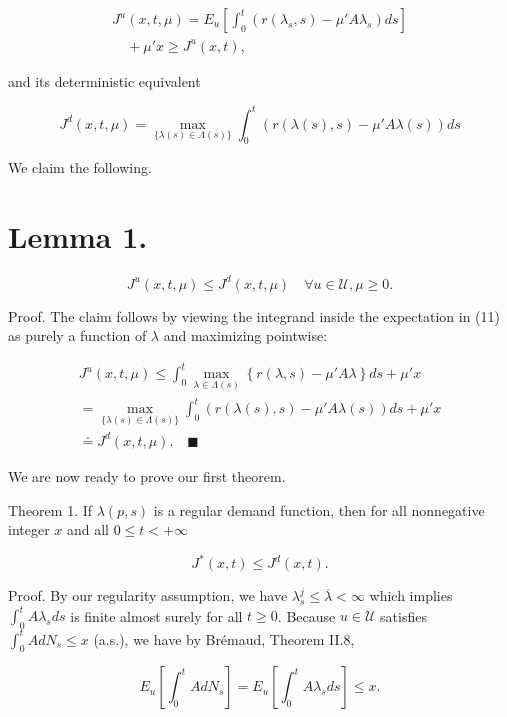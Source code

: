 \[
\begin{array}{l}
J^u(x, t, \mu) = E_u \left[ \int_{0}^{t} \left( r(\lambda_s, s) - \mu' A \lambda_s \right) ds \right] \\
\quad +  \mu' x \geqslant J^u(x, t),
\end{array}
\]

and its deterministic equivalent

\[
J^d(x, t, \mu) = \operatorname*{max}_{\{\lambda(s) \in \Lambda(s)\}} \int_{0}^{t} \left( r(\lambda(s), s) - \mu' A \lambda(s) \right) ds
\]

We claim the following.

\section{Lemma 1.}\label{lemma-1.}

\[
J^u(x, t, \mu) \leqslant J^d(x, t, \mu) \quad \forall u \in \mathcal{U}, \mu \geqslant 0.
\]

Proof. The claim follows by viewing the integrand inside the expectation in (11) as purely a function of \(\lambda\) and maximizing pointwise:

\[
\begin{array}{l}
\displaystyle J^u(x, t, \mu) \leqslant \int_{0}^{t} \max_{\lambda \in \Lambda(s)} \left\{ r(\lambda, s) - \mu' A \lambda \right\} ds + \mu' x \\
\displaystyle = \max_{\{\lambda(s) \in \Lambda(s)\}} \int_{0}^{t} \left( r(\lambda(s), s) - \mu' A \lambda(s) \right) ds + \mu' x \\
\displaystyle \doteq J^d(x, t, \mu). \quad \blacksquare
\end{array}
\]

We are now ready to prove our first theorem.

Theorem 1. If \(\lambda(p, s)\) is a regular demand function, then for all nonnegative integer \(x\) and all \(0 \leqslant t < +\infty\)

\[
J^*(x, t) \leqslant J^d(x, t).
\]

Proof. By our regularity assumption, we have \(\lambda_s^j \leqslant \overline{\lambda} < \infty\) which implies \(\int_{0}^{t} A \lambda_s  ds\) is finite almost surely for all \(t \geq 0\). Because \(u \in \mathcal{U}\) satisfies \(\int_{0}^{t} A dN_s \leqslant x\) (a.s.), we have by Brémaud, Theorem II.8,

\[
E_u \left[ \int_{0}^{t} A dN_s \right] = E_u \left[ \int_{0}^{t} A \lambda_s  ds \right] \leqslant x.
\]

